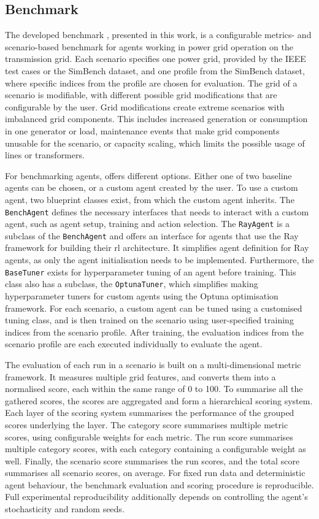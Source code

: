 \subsection{Benchmark}\label{ssec:contribution-benchmark}
The developed benchmark \benchmark, presented in this work, is a configurable metrics- and scenario-based benchmark for agents working in power grid operation on the transmission grid. Each scenario specifies one power grid, provided by the IEEE test cases or the SimBench dataset, and one profile from the SimBench dataset, where specific indices from the profile are chosen for evaluation. The grid of a scenario is modifiable, with different possible grid modifications that are configurable by the user. Grid modifications create extreme scenarios with imbalanced grid components. This includes increased generation or consumption in one generator or load, maintenance events that make grid components unusable for the scenario, or capacity scaling, which limits the possible usage of lines or transformers. 

For benchmarking agents, \benchmark offers different options. Either one of two baseline agents can be chosen, or a custom agent created by the user. To use a custom agent, two blueprint classes exist, from which the custom agent inherits. The \texttt{BenchAgent} defines the necessary interfaces that \benchmark needs to interact with a custom agent, such as agent setup, training and action selection. The \texttt{RayAgent} is a subclass of the \texttt{BenchAgent} and offers an interface for agents that use the Ray framework for building their \ac{rl} architecture. It simplifies agent definition for Ray agents, as only the agent initialisation needs to be implemented. Furthermore, the \texttt{BaseTuner} exists for hyperparameter tuning of an agent before training. This class also has a subclass, the \texttt{OptunaTuner}, which simplifies making hyperparameter tuners for custom agents using the Optuna optimisation framework. For each scenario, a custom agent can be tuned using a customised tuning class, and is then trained on the scenario using user-specified training indices from the scenario profile. After training, the evaluation indices from the scenario profile are each executed individually to evaluate the agent.

The evaluation of each run in a scenario is built on a multi-dimensional metric framework. It measures multiple grid features, and converts them into a normalised score, each within the same range of 0 to 100. To summarise all the gathered scores, the scores are aggregated and form a hierarchical scoring system. Each layer of the scoring system summarises the performance of the grouped scores underlying the layer. The category score summarises multiple metric scores, using configurable weights for each metric. The run score summarises multiple category scores, with each category containing a configurable weight as well. Finally, the scenario score summarises the run scores, and the total score summarises all scenario scores, on average. For fixed run data and deterministic agent behaviour, the benchmark evaluation and scoring procedure is reproducible. Full experimental reproducibility additionally depends on controlling the agent's stochasticity and random seeds.

